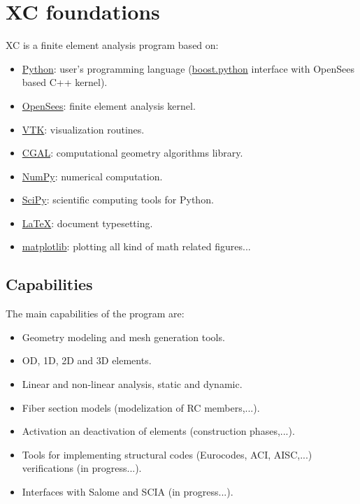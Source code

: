 \section{XC foundations}
XC is a finite element analysis program based on:

\begin{itemize}
  \item \href{https://www.python.org/}{Python}: user's programming language (\href{https://wiki.python.org/moin/boost.python}{boost.python} interface with OpenSees based C++ kernel).
  \item \href{http://opensees.berkeley.edu}{OpenSees}: finite element analysis kernel.
  \item \href{http://www.vtk.org/}{VTK}: visualization routines.
  \item \href{http://www.cgal.org/}{CGAL}: computational geometry algorithms library.
  \item \href{http://www.numpy.org/}{NumPy}: numerical computation.
  \item \href{https://www.scipy.org/}{SciPy}: scientific computing tools for Python.
  \item \href{https://www.latex-project.org/}{LaTeX}: document typesetting.
  \item \href{http://matplotlib.org/}{matplotlib}: plotting all kind of math related figures...
\end{itemize}

\subsection{Capabilities}
The main capabilities of the program are:

\begin{itemize}
  \item Geometry modeling and mesh generation tools.
  \item OD, 1D, 2D and 3D elements.
  \item Linear and non-linear analysis, static and dynamic.
  \item Fiber section models (modelization of RC members,...).
  \item Activation an deactivation of elements (construction phases,...).
  \item Tools for implementing structural codes (Eurocodes, ACI, AISC,...) verifications (in progress...).
  \item Interfaces with Salome and SCIA (in progress...).
\end{itemize}

